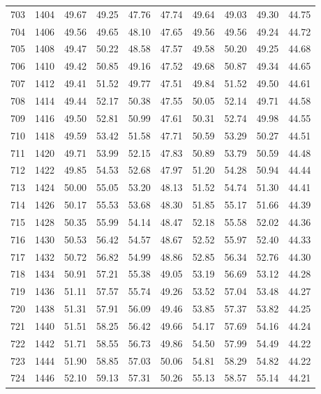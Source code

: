 \begin{longtable}{rrllllllll}
		703 & 1404 & 49.67 & 49.25 & 47.76 & 47.74 & 49.64 & 49.03 & 49.30 & 44.75 \\ 
		704 & 1406 & 49.56 & 49.65 & 48.10 & 47.65 & 49.56 & 49.56 & 49.24 & 44.72 \\ 
		705 & 1408 & 49.47 & 50.22 & 48.58 & 47.57 & 49.58 & 50.20 & 49.25 & 44.68 \\ 
		706 & 1410 & 49.42 & 50.85 & 49.16 & 47.52 & 49.68 & 50.87 & 49.34 & 44.65 \\ 
		707 & 1412 & 49.41 & 51.52 & 49.77 & 47.51 & 49.84 & 51.52 & 49.50 & 44.61 \\ 
		708 & 1414 & 49.44 & 52.17 & 50.38 & 47.55 & 50.05 & 52.14 & 49.71 & 44.58 \\ 
		709 & 1416 & 49.50 & 52.81 & 50.99 & 47.61 & 50.31 & 52.74 & 49.98 & 44.55 \\ 
		710 & 1418 & 49.59 & 53.42 & 51.58 & 47.71 & 50.59 & 53.29 & 50.27 & 44.51 \\ 
		711 & 1420 & 49.71 & 53.99 & 52.15 & 47.83 & 50.89 & 53.79 & 50.59 & 44.48 \\ 
		712 & 1422 & 49.85 & 54.53 & 52.68 & 47.97 & 51.20 & 54.28 & 50.94 & 44.44 \\ 
		713 & 1424 & 50.00 & 55.05 & 53.20 & 48.13 & 51.52 & 54.74 & 51.30 & 44.41 \\ 
		714 & 1426 & 50.17 & 55.53 & 53.68 & 48.30 & 51.85 & 55.17 & 51.66 & 44.39 \\ 
		715 & 1428 & 50.35 & 55.99 & 54.14 & 48.47 & 52.18 & 55.58 & 52.02 & 44.36 \\ 
		716 & 1430 & 50.53 & 56.42 & 54.57 & 48.67 & 52.52 & 55.97 & 52.40 & 44.33 \\ 
		717 & 1432 & 50.72 & 56.82 & 54.99 & 48.86 & 52.85 & 56.34 & 52.76 & 44.30 \\ 
		718 & 1434 & 50.91 & 57.21 & 55.38 & 49.05 & 53.19 & 56.69 & 53.12 & 44.28 \\ 
		719 & 1436 & 51.11 & 57.57 & 55.74 & 49.26 & 53.52 & 57.04 & 53.48 & 44.27 \\ 
		720 & 1438 & 51.31 & 57.91 & 56.09 & 49.46 & 53.85 & 57.37 & 53.82 & 44.25 \\ 
		721 & 1440 & 51.51 & 58.25 & 56.42 & 49.66 & 54.17 & 57.69 & 54.16 & 44.24 \\ 
		722 & 1442 & 51.71 & 58.55 & 56.73 & 49.86 & 54.50 & 57.99 & 54.49 & 44.22 \\ 
		723 & 1444 & 51.90 & 58.85 & 57.03 & 50.06 & 54.81 & 58.29 & 54.82 & 44.22 \\ 
		724 & 1446 & 52.10 & 59.13 & 57.31 & 50.26 & 55.13 & 58.57 & 55.14 & 44.21 \\ 

\end{longtable}
